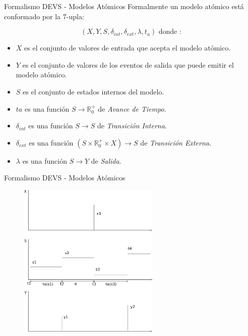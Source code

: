 \documentclass[10pt,handout]{beamer}
\begin{document}
\begin{frame}{Formalismo DEVS - Modelos Atómicos}
	Formalmente un modelo atómico está conformado por la 7-upla:

	\begin{equation*} 
	(X, Y, S, \delta_{int} , \delta_{ext}, \lambda, t_{a}) \mbox{ donde :}
	\end{equation*}

	\begin{itemize}
	\item<1-> $X$ es el conjunto de valores de entrada que acepta el modelo atómico.
	\item<2-> $Y$ es el conjunto de valores de los eventos de salida que puede emitir el modelo atómico.
	\item<3-> $S$ es el conjunto de estados internos del modelo.
	\item<4-> $ta$ es una función $S \to \mathbb{R}^{+}_{0}$ de \emph{Avance de Tiempo}.
	\item<5-> $\delta_{int}$ es una función $S \to S$ de \emph{Transición Interna}.
	\item<6-> $\delta_{ext}$ es una función $(S \times \mathbb{R}^{+}_{0} \times X) \to S$ de \emph{Transición Externa}.
	\item<7-> $\lambda$ es una función $S \to Y$ de \emph{Salida}.
	\end{itemize}
\end{frame}

\begin{frame}{Formalismo DEVS - Modelos Atómicos}
	\begin{figure}[H]
	  \includegraphics[width=0.6\textwidth]{devs-atomic}
	\end{figure}
\end{frame}
\end{document}
